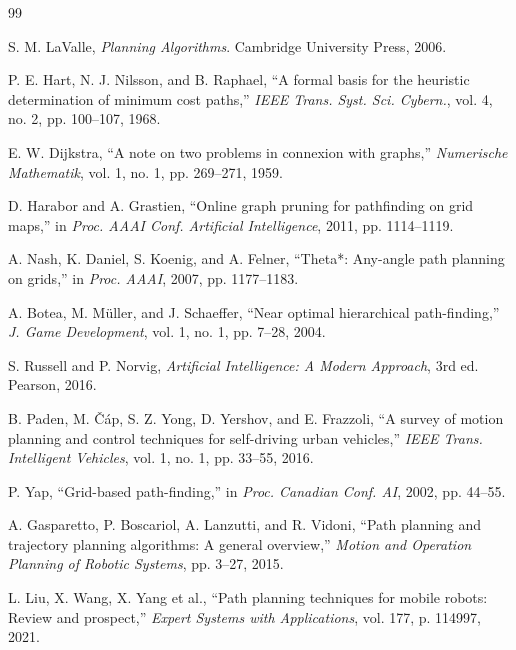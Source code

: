 \documentclass[journal]{IEEEtran}
\begin{document}
\begin{thebibliography}{99}

S. M. LaValle, \emph{Planning Algorithms}. Cambridge University Press, 2006.

P. E. Hart, N. J. Nilsson, and B. Raphael, ``A formal basis for the heuristic determination of minimum cost paths,'' \emph{IEEE Trans. Syst. Sci. Cybern.}, vol. 4, no. 2, pp. 100--107, 1968.

E. W. Dijkstra, ``A note on two problems in connexion with graphs,'' \emph{Numerische Mathematik}, vol. 1, no. 1, pp. 269--271, 1959.

D. Harabor and A. Grastien, ``Online graph pruning for pathfinding on grid maps,'' in \emph{Proc. AAAI Conf. Artificial Intelligence}, 2011, pp. 1114--1119.

A. Nash, K. Daniel, S. Koenig, and A. Felner, ``Theta*: Any-angle path planning on grids,'' in \emph{Proc. AAAI}, 2007, pp. 1177--1183.

A. Botea, M. Müller, and J. Schaeffer, ``Near optimal hierarchical path-finding,'' \emph{J. Game Development}, vol. 1, no. 1, pp. 7--28, 2004.

S. Russell and P. Norvig, \emph{Artificial Intelligence: A Modern Approach}, 3rd ed. Pearson, 2016.

B. Paden, M. Čáp, S. Z. Yong, D. Yershov, and E. Frazzoli, ``A survey of motion planning and control techniques for self-driving urban vehicles,'' \emph{IEEE Trans. Intelligent Vehicles}, vol. 1, no. 1, pp. 33--55, 2016.

P. Yap, ``Grid-based path-finding,'' in \emph{Proc. Canadian Conf. AI}, 2002, pp. 44--55.

A. Gasparetto, P. Boscariol, A. Lanzutti, and R. Vidoni, ``Path planning and trajectory planning algorithms: A general overview,'' \emph{Motion and Operation Planning of Robotic Systems}, pp. 3--27, 2015.

L. Liu, X. Wang, X. Yang et al., ``Path planning techniques for mobile robots: Review and prospect,'' \emph{Expert Systems with Applications}, vol. 177, p. 114997, 2021.

\end{thebibliography}
\end{document}
